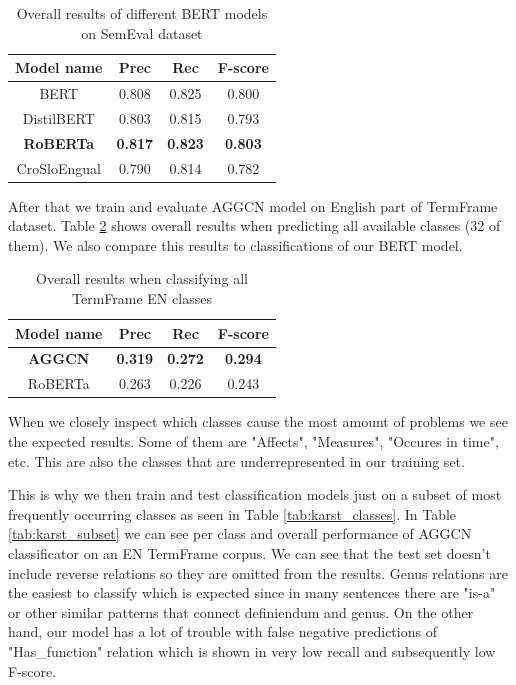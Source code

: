 \documentclass[fleqn,moreauthors,10pt]{ds_report}
\begin{document}
\begin{table}[h]
    \centering
    \begin{tabular}{|c|c|c|c|}
        \hline
        \textbf{Model name} & \textbf{Prec} & \textbf{Rec} & \textbf{F-score} \\ \hline \hline
        BERT        &  0.808  &  0.825  &  0.800 \\ \hline
        DistilBERT     &  0.803  &  0.815  &  0.793 \\ \hline
        \textbf{RoBERTa}   &  \textbf{0.817}  & \textbf{0.823}  &  \textbf{0.803} \\ \hline
        CroSloEngual   &  0.790  &  0.814  &  0.782 \\ \hline
    \end{tabular}
    \caption{Overall results of different BERT models on SemEval dataset}
    \label{tab:semeval_bert}
\end{table}

\par After that we train and evaluate AGGCN model on English part of TermFrame dataset. Table \ref{tab:karst_all} shows overall results when predicting all available classes (32 of them). We also compare this results to classifications of our BERT model.

\begin{table}[h]
    \centering
    \begin{tabular}{|c|c|c|c|}
        \hline
        \textbf{Model name} & \textbf{Prec} & \textbf{Rec} & \textbf{F-score} \\ \hline \hline
        \textbf{AGGCN}        &  \textbf{0.319}  &  \textbf{0.272}  &  \textbf{0.294} \\ \hline
        RoBERTa     &  0.263  &  0.226  &  0.243 \\ \hline
    \end{tabular}
    \caption{Overall results when classifying all TermFrame EN classes}
    \label{tab:karst_all}
\end{table}

\newpage
\par When we closely inspect which classes cause the most amount of problems we see the expected results. Some of them are "Affects", "Measures", "Occures in time", etc. This are also the classes that are underrepresented in our training set.

\par This is why we then train and test classification models just on a subset of most frequently occurring classes as seen in Table \ref{tab:karst_classes}. In Table \ref{tab:karst_subset} we can see per class and overall performance of AGGCN classificator on an EN TermFrame corpus. We can see that the test set doesn't include reverse relations so they are omitted from the results. Genus relations are the easiest to classify which is expected since in many sentences there are "is-a" or other similar patterns that connect definiendum and genus. On the other hand, our model has a lot of trouble with false negative predictions of "Has\_function" relation which is shown in very low recall and subsequently low F-score.
\end{document}

